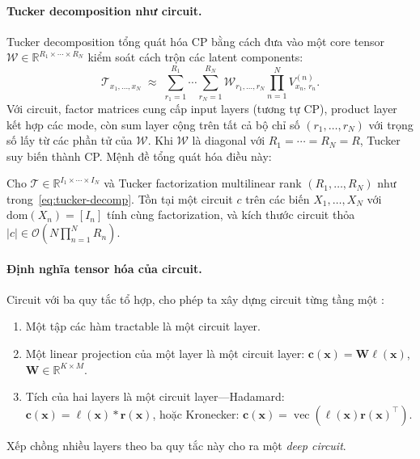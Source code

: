 \paragraph{Tucker decomposition như circuit.}
Tucker decomposition tổng quát hóa CP bằng cách đưa vào một core tensor
$\mathcal{W} \in \mathbb{R}^{R_1 \times \cdots \times R_N}$ kiểm soát cách trộn
các latent components:
\begin{equation}
    \mathcal{T}_{x_1, \ldots, x_N}
    \;\approx\;
    \sum_{r_1=1}^{R_1} \cdots \sum_{r_N=1}^{R_N}
    \mathcal{W}_{r_1, \ldots, r_N}
    \prod_{n=1}^{N} V^{(n)}_{x_n,\, r_n}.
    \label{eq:tucker-decomp}
\end{equation}
Với circuit, factor matrices cung cấp input layers (tương tự CP),
product layer kết hợp các mode, còn sum layer cộng trên tất cả bộ chỉ số
$(r_1, \ldots, r_N)$ với trọng số lấy từ các phần tử của $\mathcal{W}$.  Khi
$\mathcal{W}$ là diagonal với $R_1 = \cdots = R_N = R$, Tucker suy biến thành CP.
Mệnh đề tổng quát hóa điều này:

\begin{proposition}
\label{prop:tucker-circuit}
Cho $\mathcal{T} \in \mathbb{R}^{I_1 \times \cdots \times I_N}$ và Tucker
factorization multilinear rank $(R_1, \ldots, R_N)$ như trong~\eqref{eq:tucker-decomp}.
Tồn tại một circuit $c$ trên các biến $X_1, \ldots, X_N$ với $\mathrm{dom}(X_n) =
[I_n]$ tính cùng factorization, và kích thước circuit thỏa
$|c| \in \mathcal{O}\!\left(N \prod_{n=1}^{N} R_n\right)$.
\end{proposition}

\paragraph{Định nghĩa tensor hóa của circuit.}
Circuit với ba quy tắc tổ hợp, cho phép ta xây dựng circuit từng
tầng một \cite{chrysos2025foundationsTutorial}:
\begin{enumerate}[label=\Roman*.]
    \item Một tập các hàm tractable là một circuit layer.
    \item Một linear projection của một layer là một circuit layer:
    $\mathbf{c}(\mathbf{x}) = \mathbf{W}\boldsymbol{\ell}(\mathbf{x})$,
    $\mathbf{W} \in \mathbb{R}^{K \times M}$.
    \item Tích của hai layers là một circuit layer---Hadamard:
    $\mathbf{c}(\mathbf{x}) = \boldsymbol{\ell}(\mathbf{x}) \ast \mathbf{r}(\mathbf{x})$,
    hoặc Kronecker:
    $\mathbf{c}(\mathbf{x}) = \operatorname{vec}\!\left(\boldsymbol{\ell}(\mathbf{x})\mathbf{r}(\mathbf{x})^{\top}\right)$.
\end{enumerate}
Xếp chồng nhiều layers theo ba quy tắc này cho ra một \emph{deep circuit}.

